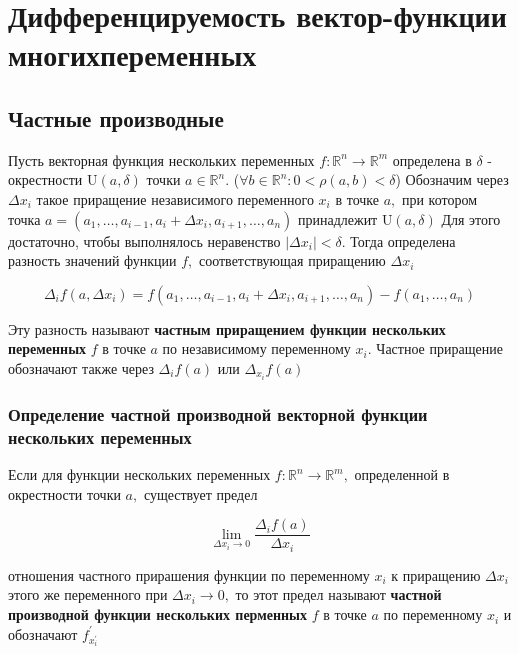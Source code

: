 \section{Дифференцируемость вектор-функции многихпеременных}
\subsection{Частные производные}

Пусть векторная функция нескольких переменных
\(f: \mathbb{R}^{n} \rightarrow \mathbb{R}^{m}\) определена в \(\delta\)
- окрестности \(\mathrm{U}(a, \delta)\) точки \(a \in \mathbb{R}^{n} .\) (\(\forall b \in  \mathbb{R}^{n}: 0 < \rho(a,b) < \delta  \))
Обозначим через \(\Delta x_{i}\) такое приращение независимого
переменного \(x_{i}\) в точке \(a,\) при котором точка
\(a=\left(a_{1}, \ldots, a_{i-1}, a_{i}+\Delta x_{i}, a_{i+1}, \ldots, a_{n}\right)\)
принадлежит \(\mathrm{U}(a, \delta)\) Для этого достаточно, чтобы
выполнялось неравенство \(\left|\Delta x_{i}\right|<\delta .\) Тогда
определена разность значений функции \(f,\) соответствующая приращению
\(\Delta x_{i}\)

\[\Delta_{i} f\left(a, \Delta x_{i}\right)=f\left(a_{1}, \ldots, a_{i-1}, a_{i}+\Delta x_{i}, a_{i+1}, \ldots, a_{n}\right)-f\left(a_{1}, \ldots, a_{n}\right)\]

Эту разность называют \textbf{частным приращением функции нескольких
переменных} \(f\) в точке \(a\) по независимому переменному \(x_{i} .\)
Частное приращение обозначают также через \(\Delta_{i} f(a)\) или
\(\Delta_{x_{i}} f(a)\)

\subsubsection{Определение частной производной векторной функции нескольких переменных}

Если для функции нескольких переменных
\(f: \mathbb{R}^{n} \rightarrow \mathbb{R}^{m},\) определенной в
окрестности точки \(a,\) существует предел

\[\lim _{\Delta x_{i} \rightarrow 0} \frac{\Delta_{i} f(a)}{\Delta x_{i}}\]

отношения частного прирашения функции по переменному \(x_{i}\) к
приращению \(\Delta x_{i}\) этого же переменного при
\(\Delta x_{i} \rightarrow 0,\) то этот предел называют \textbf{частной
производной функции нескольких перменных} \(f\) в точке \(a\) по
переменному \(x_{i}\) и обозначают \(f_{x_{i}^{\prime}}^{\prime}\)

